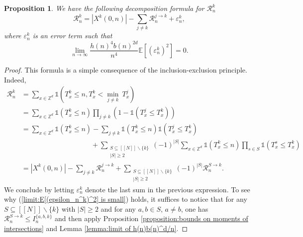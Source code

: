 \documentclass[12pt]{article}
\newcommand{\R}{\mathcal R}
\newcommand{\EE}{\mathbb E}
\newcommand{\1}{\mathds{1}}
\newcommand{\ZZ}{\mathbb Z}
\newtheorem{proposition}{Proposition}
\numberwithin{equation}{section}
\begin{document}
\begin{proposition}
\label{proposition:decomposition formula for mathcal R_n^k}
    We have the following decomposition formula for $\R_n^k$
    \begin{equation}
    \label{eq:decomposition formula for R_n^k}
        \R_n^k=\left|X^k(0,n)\right|-\sum_{j\ne k}\R_n^{j\rightarrow k}+\varepsilon_n^k,
    \end{equation}
    where $\varepsilon_n^k$ is an error term such that 
    \begin{equation}
        \label{limit:E[(epsilon_n^k)^2] is small}
        \lim_{n\rightarrow\infty}\frac{h(n)^4b(n)^{2d}}{n^4}\EE\left[\left(\varepsilon_{n}^k\right)^2\right]=0.
    \end{equation}
\end{proposition}

\begin{proof}
    This formula is a simple consequence of the inclusion-exclusion principle. Indeed,
    \begin{align*}
        \R_n^k&=\sum_{x\in\ZZ^d}\1\left(T_x^k\le n,T_x^k<\underset{j\ne k}\min\  T_x^j\right)\\
        &=\sum_{x\in\ZZ^d}\1\left(T_x^k\le n\right)\prod_{j\ne k}\left(1-\1\left(T_x^j\le T_x^k\right)\right)\\
        &=\sum_{x\in\ZZ^d}\1\left(T_x^k\le n\right)-\sum_{j\ne k}\1\left(T_x^k\le n\right)\1\left(T_x^j\le T_x^k\right)\\
        &\hspace{10em}+\sum_{\substack{S\subseteq[\![N]\!]\backslash\{k\} \\ |S|\ge2}}(-1)^{|S|}\sum_{x\in\ZZ^d}\1\left(T_x^k\le n\right)\prod_{s\in S}\1\left(T_x^s\le T_x^k\right)\\
        &=\left|X^k(0,n)\right|-\sum_{j\ne k}\R_n^{j\rightarrow k}+\sum_{\substack{S\subseteq[\![N]\!]\backslash\{k\} \\ |S|\ge2}}(-1)^{|S|}\R_n^{S\rightarrow k}.
    \end{align*}
    We conclude by letting $\varepsilon_n^k$ denote the last sum in the previous expression. To see why (\ref{limit:E[(epsilon_n^k)^2] is small}) holds, it suffices to notice that for any $S\subseteq[\![N]\!]\backslash\{k\}$ with $|S|\ge2$ and for any $a,b\in S$, $a\ne b$, one has $\R_n^{S\rightarrow k}\le I_n^{\{a,b,k\}}$ and then apply Proposition \ref{proposition:bounds on moments of intersections} and Lemma \ref{lemma:limit of h(n)b(n)^d/n}.
\end{proof}
\end{document}
